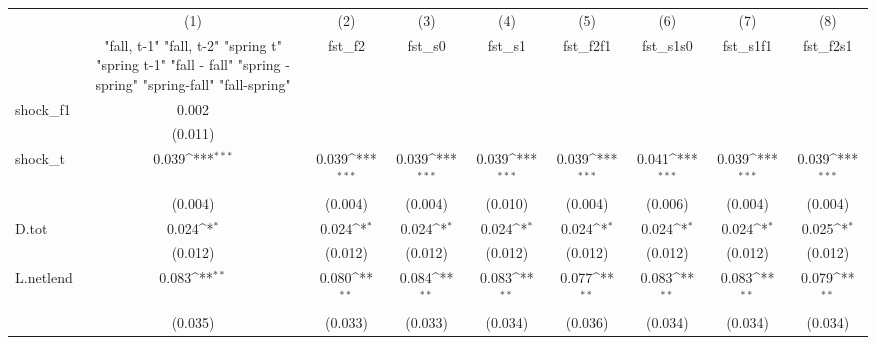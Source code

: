 {
\def\sym#1{\ifmmode^{#1}\else\(^{#1}\)\fi}
\begin{tabular}{l*{8}{c}}
\toprule
            &\multicolumn{1}{c}{(1)}&\multicolumn{1}{c}{(2)}&\multicolumn{1}{c}{(3)}&\multicolumn{1}{c}{(4)}&\multicolumn{1}{c}{(5)}&\multicolumn{1}{c}{(6)}&\multicolumn{1}{c}{(7)}&\multicolumn{1}{c}{(8)}\\
            &\multicolumn{1}{c}{  "fall, t-1" "fall, t-2" "spring t" "spring t-1"  "fall - fall" "spring - spring" "spring-fall" "fall-spring" }&\multicolumn{1}{c}{fst\_f2}&\multicolumn{1}{c}{fst\_s0}&\multicolumn{1}{c}{fst\_s1}&\multicolumn{1}{c}{fst\_f2f1}&\multicolumn{1}{c}{fst\_s1s0}&\multicolumn{1}{c}{fst\_s1f1}&\multicolumn{1}{c}{fst\_f2s1}\\
\midrule
shock\_f1    &       0.002         &                     &                     &                     &                     &                     &                     &                     \\
            &     (0.011)         &                     &                     &                     &                     &                     &                     &                     \\
\addlinespace
shock\_t     &       0.039\sym{***}&       0.039\sym{***}&       0.039\sym{***}&       0.039\sym{***}&       0.039\sym{***}&       0.041\sym{***}&       0.039\sym{***}&       0.039\sym{***}\\
            &     (0.004)         &     (0.004)         &     (0.004)         &     (0.010)         &     (0.004)         &     (0.006)         &     (0.004)         &     (0.004)         \\
\addlinespace
D.tot       &       0.024\sym{*}  &       0.024\sym{*}  &       0.024\sym{*}  &       0.024\sym{*}  &       0.024\sym{*}  &       0.024\sym{*}  &       0.024\sym{*}  &       0.025\sym{*}  \\
            &     (0.012)         &     (0.012)         &     (0.012)         &     (0.012)         &     (0.012)         &     (0.012)         &     (0.012)         &     (0.012)         \\
\addlinespace
L.netlend   &       0.083\sym{**} &       0.080\sym{**} &       0.084\sym{**} &       0.083\sym{**} &       0.077\sym{**} &       0.083\sym{**} &       0.083\sym{**} &       0.079\sym{**} \\
            &     (0.035)         &     (0.033)         &     (0.033)         &     (0.034)         &     (0.036)         &     (0.034)         &     (0.034)         &     (0.034)         \\

\end{tabular}}
